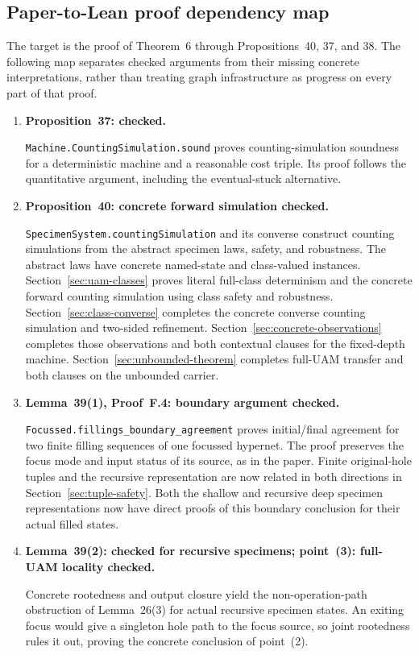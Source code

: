 \subsection{Paper-to-Lean proof dependency map}
The target is the proof of Theorem~6 through Propositions~40, 37, and 38.
The following map separates checked arguments from their missing concrete
interpretations, rather than treating graph infrastructure as progress on every
part of that proof.
\begin{enumerate}
\item \textbf{Proposition~37: checked.}\par
\texttt{Machine.CountingSimulation.sound} proves counting-simulation soundness
for a deterministic machine and a reasonable cost triple. Its proof follows
the quantitative argument, including the eventual-stuck alternative.
\item \textbf{Proposition~40: concrete forward simulation checked.}\par
\texttt{SpecimenSystem.countingSimulation} and its converse construct counting
simulations from the abstract specimen laws, safety, and robustness. The abstract laws have concrete named-state and class-valued instances. Section~\ref{sec:uam-classes} proves literal full-class determinism and the concrete forward counting simulation using class safety and robustness. Section~\ref{sec:class-converse} completes the concrete converse counting simulation and two-sided refinement. Section~\ref{sec:concrete-observations} completes those observations and both contextual clauses for the fixed-depth machine. Section~\ref{sec:unbounded-theorem} completes full-UAM transfer and both clauses on the unbounded carrier.
\item \textbf{Lemma~39(1), Proof~F.4: boundary argument checked.}\par
\texttt{Focussed.fillings\_boundary\_agreement} proves initial/final agreement
for two finite filling sequences of one focussed hypernet. The proof preserves
the focus mode and input status of its source, as in the paper. Finite original-hole tuples and the recursive representation are now
related in both directions in Section~\ref{sec:tuple-safety}.
Both the shallow and recursive deep specimen representations now have direct
proofs of this boundary conclusion for their actual filled states.
\item \textbf{Lemma~39(2): checked for recursive specimens; point~(3): full-UAM locality checked.}\par
Concrete rootedness and output closure yield the non-operation-path obstruction
of Lemma~26(3) for actual recursive specimen states. An exiting focus would give
a singleton hole path to the focus source, so joint rootedness rules it out,
proving the concrete conclusion of point~(2).


\end{enumerate}
